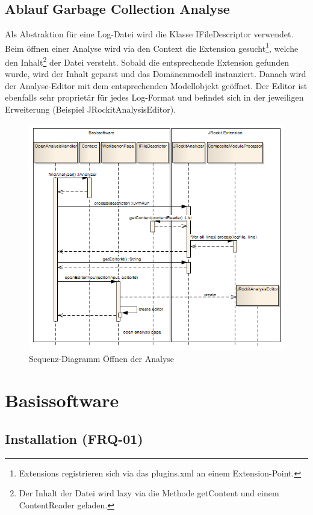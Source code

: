 \subsection{Ablauf Garbage Collection Analyse}
Als Abstraktion für eine Log-Datei wird die Klasse IFileDescriptor verwendet. Beim öffnen einer Analyse wird via den Context die Extension gesucht\footnote{Extensions registrieren sich via das plugins.xml an einem Extension-Point. }, welche den Inhalt\footnote{Der Inhalt der Datei wird lazy via die Methode getContent und einem ContentReader geladen.} der Datei versteht. Sobald die entsprechende Extension gefunden wurde, wird der Inhalt geparst und das Domänenmodell instanziert.
Danach wird der Analyse-Editor mit dem entsprechenden Modellobjekt geöffnet. Der Editor ist ebenfalls sehr proprietär für jedes Log-Format und befindet sich in der jeweiligen Erweiterung (Beispiel JRockitAnalysisEditor). 
 \begin{figure}[H]
  	\centering
    	\includegraphics[width=16cm]{images/core_sequence_analysis}
	\caption{Sequenz-Diagramm Öffnen der Analyse}
\end{figure}
\section{Basissoftware}
\subsection{Installation (FRQ-01)}
